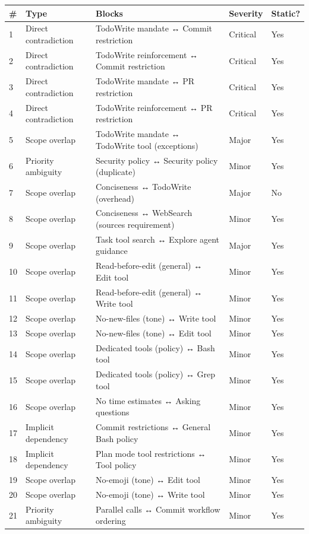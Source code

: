 \begin{table}[t]
\small
\begin{tabular}{@{}llp{}ll@{}}
\toprule
\# & Type & Blocks & Severity & Static? \\
\midrule
1 & Direct contradiction & TodoWrite mandate ↔ Commit restriction & Critical & Yes \\
2 & Direct contradiction & TodoWrite reinforcement ↔ Commit restriction & Critical & Yes \\
3 & Direct contradiction & TodoWrite mandate ↔ PR restriction & Critical & Yes \\
4 & Direct contradiction & TodoWrite reinforcement ↔ PR restriction & Critical & Yes \\
5 & Scope overlap & TodoWrite mandate ↔ TodoWrite tool (exceptions) & Major & Yes \\
6 & Priority ambiguity & Security policy ↔ Security policy (duplicate) & Minor & Yes \\
7 & Scope overlap & Conciseness ↔ TodoWrite (overhead) & Major & No \\
8 & Scope overlap & Conciseness ↔ WebSearch (sources requirement) & Minor & Yes \\
9 & Scope overlap & Task tool search ↔ Explore agent guidance & Major & Yes \\
10 & Scope overlap & Read-before-edit (general) ↔ Edit tool & Minor & Yes \\
11 & Scope overlap & Read-before-edit (general) ↔ Write tool & Minor & Yes \\
12 & Scope overlap & No-new-files (tone) ↔ Write tool & Minor & Yes \\
13 & Scope overlap & No-new-files (tone) ↔ Edit tool & Minor & Yes \\
14 & Scope overlap & Dedicated tools (policy) ↔ Bash tool & Minor & Yes \\
15 & Scope overlap & Dedicated tools (policy) ↔ Grep tool & Minor & Yes \\
16 & Scope overlap & No time estimates ↔ Asking questions & Minor & Yes \\
17 & Implicit dependency & Commit restrictions ↔ General Bash policy & Minor & Yes \\
18 & Implicit dependency & Plan mode tool restrictions ↔ Tool policy & Minor & Yes \\
19 & Scope overlap & No-emoji (tone) ↔ Edit tool & Minor & Yes \\
20 & Scope overlap & No-emoji (tone) ↔ Write tool & Minor & Yes \\
21 & Priority ambiguity & Parallel calls ↔ Commit workflow ordering & Minor & Yes \\
\bottomrule
\end{tabular}
\end{table}

